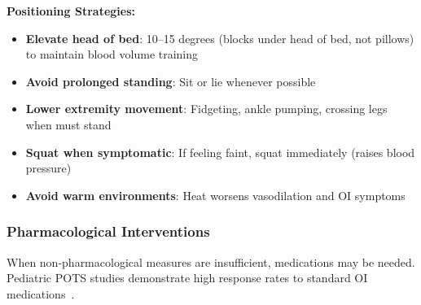 \begin{protocol}
\textbf{Positioning Strategies:}
\begin{itemize}
    \item \textbf{Elevate head of bed}: 10--15 degrees (blocks under head of bed, not pillows) to maintain blood volume training
    \item \textbf{Avoid prolonged standing}: Sit or lie whenever possible
    \item \textbf{Lower extremity movement}: Fidgeting, ankle pumping, crossing legs when must stand
    \item \textbf{Squat when symptomatic}: If feeling faint, squat immediately (raises blood pressure)
    \item \textbf{Avoid warm environments}: Heat worsens vasodilation and OI symptoms
\end{itemize}
\end{protocol}

\subsubsection{Pharmacological Interventions}

When non-pharmacological measures are insufficient, medications may be needed. Pediatric POTS studies demonstrate high response rates to standard OI medications~\cite{Ojha2024pediatricPOTS}.

